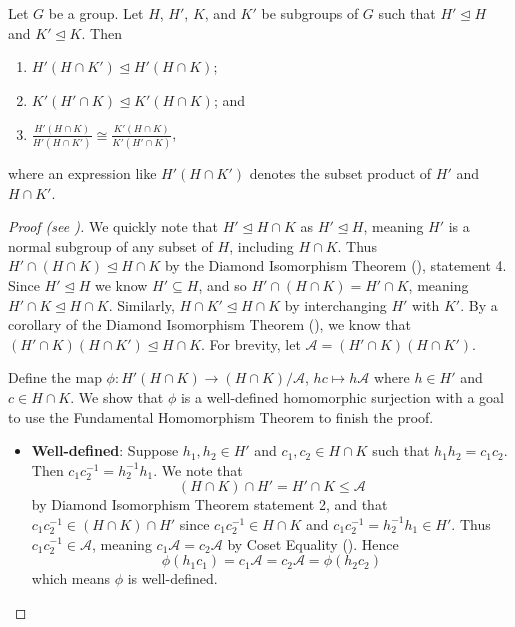 \begin{lemma}[Zassenhaus]\label{lemma-zassenhaus}
    Let $G$ be a group. Let $H$, $H'$, $K$, and $K'$ be subgroups of $G$ such that $H' \unlhd H$ and $K' \unlhd K$. Then
    \begin{enumerate}
        \item $H'(H \cap K') \unlhd H' (H \cap K)$;
        \item $K'(H' \cap K) \unlhd K' (H \cap K)$; and
        \item $\frac{H'(H\cap K)}{H'(H\cap K')} \cong \frac{K'(H\cap K)}{K'(H'\cap K)}$,
    \end{enumerate}
    where an expression like $H'(H \cap K')$ denotes the subset product of $H'$ and $H \cap K'$.
\end{lemma}
\begin{proof}[Proof (see {\cite[p.~110]{hungerford_1980}})]
    We quickly note that $H' \unlhd H \cap K$ as $H' \unlhd H$, meaning $H'$ is a normal subgroup of any subset of $H$, including $H \cap K$. Thus $H' \cap (H \cap K) \unlhd H \cap K$ by the Diamond Isomorphism Theorem (), statement 4. Since $H'\unlhd H$ we know $H' \subseteq H$, and so $H' \cap (H \cap K) = H' \cap K$, meaning $H' \cap K \unlhd H \cap K$. Similarly, $H \cap K' \unlhd H \cap K$ by interchanging $H'$ with $K'$. By a corollary of the Diamond Isomorphism Theorem (), we know that $(H' \cap K)(H \cap K') \unlhd H \cap K$. For brevity, let $\mathcal{A} = (H' \cap K)(H \cap K')$.
    
    Define the map $\phi: H'(H\cap K) \to (H\cap K)/\mathcal{A}$, $hc \mapsto h\mathcal{A}$ where $h \in H'$ and $c \in H \cap K$. We show that $\phi$ is a well-defined homomorphic surjection with a goal to use the Fundamental Homomorphism Theorem to finish the proof.
    
    \begin{itemize}
        \item \textbf{Well-defined}: Suppose $h_1, h_2 \in H'$ and $c_1, c_2 \in H \cap K$ such that $h_1h_2 = c_1c_2$. Then $c_1c_2^{-1} = h_2^{-1}h_1$. We note that
        \[
            (H \cap K) \cap H' = H' \cap K \leq \mathcal{A}    
        \]
        by Diamond Isomorphism Theorem statement 2, and that $c_1c_2^{-1} \in (H \cap K) \cap H'$ since $c_1c_2^{-1} \in H \cap K$ and $c_1c_2^{-1} = h_2^{-1}h_1 \in H'$. Thus $c_1c_2^{-1} \in \mathcal{A}$, meaning $c_1\mathcal{A} = c_2\mathcal{A}$ by Coset Equality (). Hence
        \[
            \phi(h_1c_1) = c_1\mathcal{A} = c_2\mathcal{A} = \phi(h_2c_2)        
        \]
        which means $\phi$ is well-defined.
        

\end{itemize}
\end{proof}
